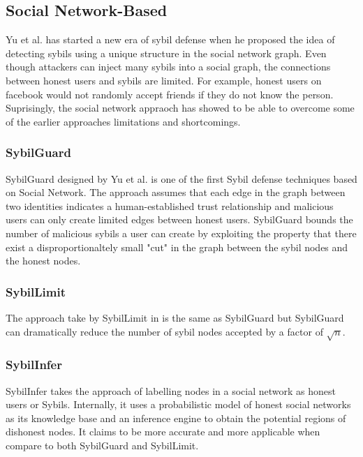 \documentclass[conference]{IEEEtran}
\begin{document}
\subsection{Social Network-Based}
Yu et al. has started a new era of sybil defense when he proposed the idea of detecting sybils using a unique structure in the social network graph. Even though attackers can inject many sybils into a social graph, the connections between honest users and sybils are limited\cite{Yu08SybilGuard}. For example, honest users on facebook would not randomly accept friends if they do not know the person. Suprisingly, the social network appraoch has showed to be able to overcome some of the earlier approaches limitations and shortcomings.

\subsubsection{SybilGuard}
SybilGuard designed by Yu et al. \cite{Yu08SybilGuard} is one of the first Sybil defense techniques based on Social Network. The approach assumes that each edge in the graph between two identities indicates a human-established trust relationship and malicious users can only create limited edges between honest users. SybilGuard bounds the number of malicious sybils a user can create by exploiting the property that there exist a disproportionaltely small "cut" in the 
graph between the sybil nodes and the honest nodes.

\subsubsection{SybilLimit}
The approach take by SybilLimit in \cite{Yu08SybilLimit} is the same as SybilGuard but SybilGuard can dramatically reduce the number of sybil nodes accepted by a factor of  $ \sqrt{n} $.

\subsubsection{SybilInfer}
SybilInfer takes the approach of labelling nodes in a social network as honest users or Sybils. Internally, it uses a probabilistic model of honest social networks as its knowledge base and an inference engine to obtain the potential regions of dishonest nodes.
It claims to be more accurate and more applicable when compare to both SybilGuard and SybilLimit.
\end{document}
